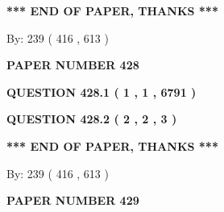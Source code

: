 \documentclass[12pt]{article}
\begin{document}
  
   
   
 \vspace{0.2in}
 
   
   
   
   
\vspace{1.0in} 
{\textbf{\large{ *** END OF PAPER, THANKS *** }}} 
   
   
\hspace{1.0in} By: 
 239 ( 416 ,  613 )
   
   
   
   
\newpage 
\setcounter{page}{ 
   428001 } 
   
   
   
   
 {\textbf{ \Large{ PAPER NUMBER  428  }}}
   
   
\vspace{0.2in}
   
   
   
   
   
   
 \vspace{0.2in}
 
 
 
 
   
   
  
\vspace{0.2in}
  
{\textbf{\Large{QUESTION
428.1 
 ( 1 , 1 , 6791 )
}}}
  
  
  
\vspace{0.2in}
  
{\textbf{\Large{QUESTION
428.2 
 ( 2 , 2 , 3 )
}}}
  
  
   
   
 \vspace{0.2in}
 
   
   
   
   
\vspace{1.0in} 
{\textbf{\large{ *** END OF PAPER, THANKS *** }}} 
   
   
\hspace{1.0in} By: 
 239 ( 416 ,  613 )
   
   
   
   
\newpage 
\setcounter{page}{ 
   429001 } 
   
   
   
   
 {\textbf{ \Large{ PAPER NUMBER  429  }}}
   
\end{document}
